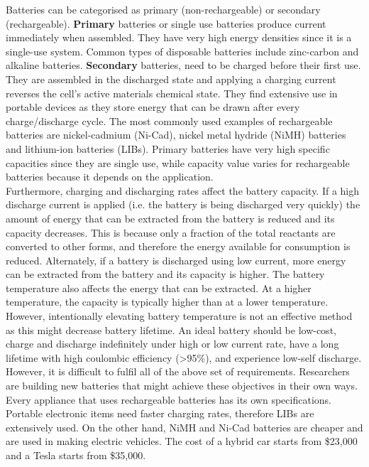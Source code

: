 Batteries can be categorised as primary (non-rechargeable) or secondary (rechargeable). \textbf{Primary} batteries or single use batteries produce current immediately when assembled. They have very high energy densities since it is a single-use system. Common types of disposable batteries include zinc-carbon and alkaline batteries. 
\textbf{Secondary} batteries, need to be charged before their first use. They are assembled in the discharged state and applying a charging current reverses the cell's active materials chemical state. They find extensive use in portable devices as they store energy that can be drawn after every charge/discharge cycle. The most commonly used examples of rechargeable batteries are nickel-cadmium (Ni-Cad), nickel metal hydride (NiMH) batteries and lithium-ion batteries (LIBs). Primary batteries have very high specific capacities since they are single use, while capacity value varies for rechargeable batteries because it depends on the application.\\  
Furthermore, charging and discharging rates affect the battery capacity. If a high discharge current is applied (i.e. the battery is being discharged very quickly) the amount of energy that can be extracted from the battery is reduced and its capacity decreases. This is because only a fraction of the total reactants are converted to other forms, and therefore the energy available for consumption is reduced. Alternately, if a battery is discharged using low current, more energy can be extracted from the battery and its capacity is higher. The battery temperature also affects the energy that can be extracted. At a higher temperature, the capacity is typically higher than at a lower temperature. However, intentionally elevating battery temperature is not an effective method as this might decrease battery lifetime\cite{leng_effect_2015, ma_temperature_2018}. 
An ideal battery should be low-cost, charge and discharge indefinitely under high or low current rate, have a long lifetime with high coulombic efficiency (>95\%), and experience low-self discharge. However, it is difficult to fulfil all of the above set of requirements. Researchers are building new batteries that might achieve these objectives in their own ways\cite{slater_sodium-ion_2013,jian_carbon_2015,aurbach_prototype_2000,lin_ultrafast_2015}. Every appliance that uses rechargeable batteries has its own specifications. Portable electronic items need faster charging rates, therefore LIBs are extensively used. On the other hand, NiMH and Ni-Cad batteries are cheaper and are used in making electric vehicles. The cost of a hybrid car starts from \$23,000 and a Tesla starts from \$35,000. \\

